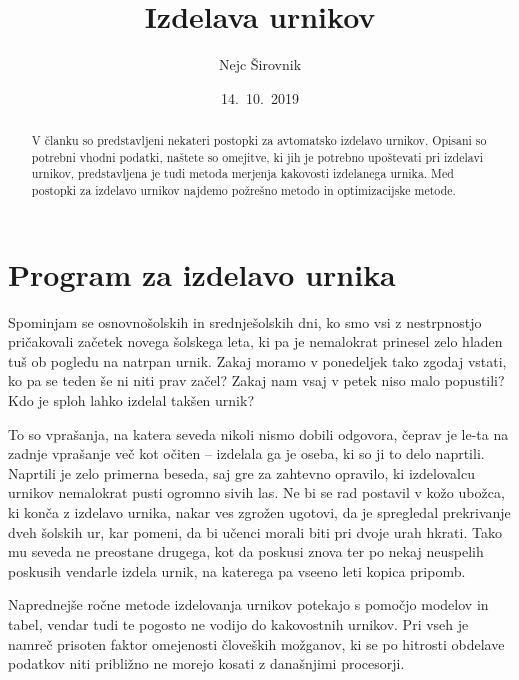 \documentclass[a4paper,10pt]{article}
\begin{document}

\title{Izdelava urnikov}
\author{Nejc Širovnik}
\date{14.\ 10.\ 2019}
\maketitle

\begin{abstract}
V članku so predstavljeni nekateri postopki za avtomatsko izdelavo urnikov. Opisani so
potrebni vhodni podatki, naštete so omejitve, ki jih je potrebno upoštevati pri izdelavi
urnikov, predstavljena je tudi metoda merjenja kakovosti izdelanega urnika. Med postopki za izdelavo urnikov najdemo požrešno metodo in optimizacijske metode.
\end{abstract}

\section{Program za izdelavo urnika}

Spominjam se osnovnošolskih in srednješolskih dni, ko smo vsi z nestrpnostjo pričakovali
začetek novega šolskega leta, ki pa je nemalokrat prinesel zelo hladen tuš ob pogledu na
natrpan urnik. Zakaj moramo v ponedeljek tako zgodaj vstati, ko pa se teden še ni niti
prav začel? Zakaj nam vsaj v petek niso malo popustili? Kdo je sploh lahko izdelal
takšen urnik?

To so vprašanja, na katera seveda nikoli nismo dobili odgovora, čeprav je le-ta na zadnje
vprašanje več kot očiten -- izdelala ga je oseba, ki so ji to delo naprtili. Naprtili je
zelo primerna beseda, saj gre za zahtevno opravilo, ki izdelovalcu urnikov nemalokrat
pusti ogromno sivih las. Ne bi se rad postavil v kožo ubožca, ki konča z izdelavo urnika,
nakar ves zgrožen ugotovi, da je spregledal prekrivanje dveh šolskih ur, kar pomeni, da
bi učenci morali biti pri dvoje urah hkrati. Tako mu seveda ne preostane drugega, kot da
poskusi znova ter po nekaj neuspelih poskusih vendarle izdela urnik, na katerega pa vseeno
leti kopica pripomb.

Naprednejše ročne metode izdelovanja urnikov potekajo s pomočjo modelov in tabel, vendar
tudi te pogosto ne vodijo do kakovostnih urnikov. Pri vseh je namreč prisoten faktor
omejenosti človeških možganov, ki se po hitrosti obdelave podatkov niti približno ne
morejo kosati z današnjimi procesorji.
\end{document}
